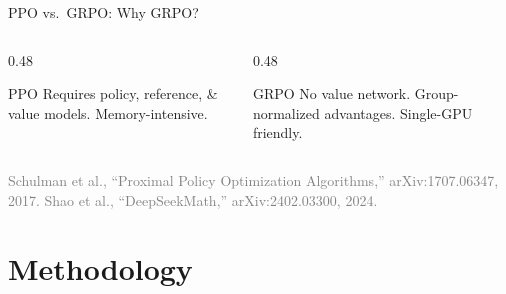 \documentclass[10pt]{beamer}
\begin{document}
\begin{frame}{PPO vs.\ GRPO: Why GRPO?}
\begin{columns}[t]
    \begin{column}{0.48\linewidth}
        \begin{block}{PPO}
            Requires policy, reference, \& value models. Memory-intensive.
        \end{block}
    \end{column}
    \begin{column}{0.48\linewidth}
        \begin{block}{GRPO}
            No value network. Group-normalized advantages. Single-GPU friendly.
        \end{block}
    \end{column}
\end{columns}
\vspace{\fill}
{\tiny \textcolor{gray}{Schulman et al., ``Proximal Policy Optimization Algorithms,'' arXiv:1707.06347, 2017. \quad Shao et al., ``DeepSeekMath,'' arXiv:2402.03300, 2024.}}
\end{frame}

\section{Methodology}
\end{document}
